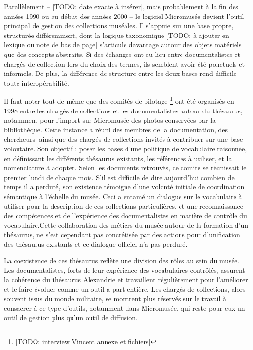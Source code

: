 Parallèlement – [TODO: date exacte à insérer], mais probablement à la fin des années 1990 ou au début des années 2000 – le logiciel Micromusée devient l’outil principal de gestion des collections muséales. Il s’appuie sur une base propre, structurée différemment, dont la logique taxonomique [TODO: à ajouter en lexique ou note de bas de page] s’articule davantage autour des objets matériels que des concepts abstraits. Si des échanges ont eu lieu entre documentalistes et chargés de collection lors du choix des termes, ils semblent avoir été ponctuels et informels. De plus, la différence de structure entre les deux bases rend difficile toute interopérabilité.

Il faut noter tout de même que des comités de pilotage \footnote{[TODO: interview Vincent annexe et fichiers]}  ont été organisés en 1998 entre les chargés de collections et les documentalistes autour du thésaurus, notamment pour l'import sur Micromusée des photos conservées par la bibliothèque. Cette instance a réuni des membres de la documentation, des chercheurs, ainsi que des chargés de collections invités à contribuer sur une base volontaire. Son objectif : poser les bases d’une politique de vocabulaire raisonnée, en définissant les différents thésaurus existants, les références à utiliser, et la nomenclature à adopter. Selon les documents retrouvés, ce comité se réunissait le premier lundi de chaque mois. S’il est difficile de dire aujourd’hui combien de temps il a perduré, son existence témoigne d’une volonté initiale de coordination sémantique à l’échelle du musée. Ceci a entamé un dialogue sur le vocabulaire à utiliser pour la description de ces collections particulières, et une reconnaissance des compétences et de l'expérience des documentalistes en matière de contrôle du vocabulaire.Cette collaboration des métiers du musée autour de la formation d'un thésaurus, ne s'est cependant pas concrétisée par des actions pour d'unification des thésaurus existants et ce dialogue officiel n'a pas perduré.

La coexistence de ces thésaurus reflète une division des rôles au sein du musée. Les documentalistes, forts de leur expérience des vocabulaires contrôlés, assurent la cohérence du thésaurus Alexandrie et travaillent régulièrement pour l'améliorer et le faire évoluer comme un outil à part entière. Les chargés de collections, alors souvent issus du monde militaire, se montrent plus réservés sur le travail à consacrer à ce type d'outils, notamment dans Micromusée, qui reste pour eux un outil de gestion plus qu’un outil de diffusion.

